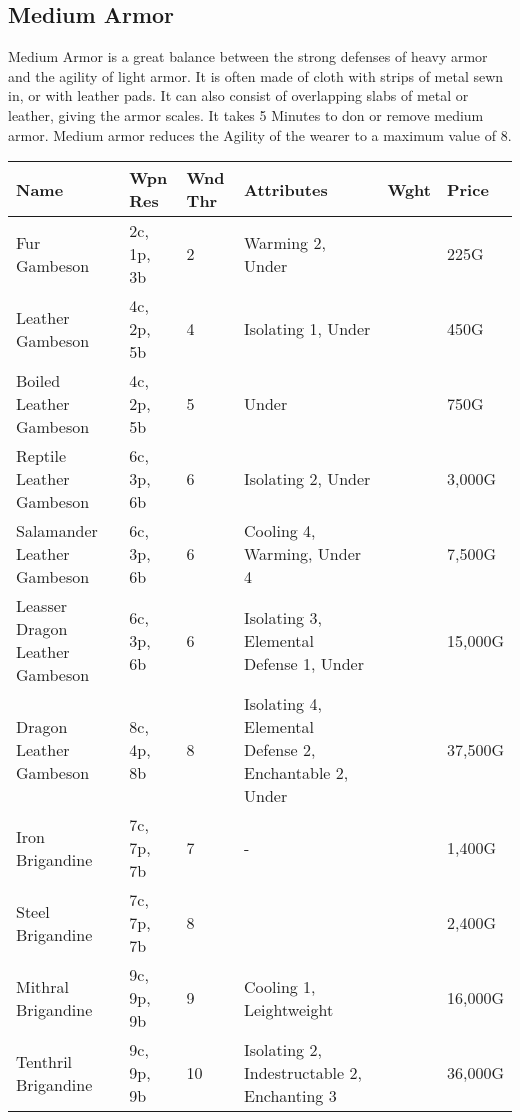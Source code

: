 \subsection{Medium Armor}

Medium Armor is a great balance between the strong defenses of heavy armor and the agility of light armor. It is often made of cloth with strips of metal sewn in, or with leather pads. It can also consist of overlapping slabs of metal or leather, giving the armor scales. It takes 5 Minutes to don or remove medium armor. Medium armor reduces the Agility of the wearer to a maximum value of 8.

\begin{longtable}{p{3.5cm} | p{1.5cm} | p{0.75cm} | p{4cm} | p{1cm} | p{1.25cm}}
	Name & Wpn Res & Wnd Thr &  Attributes & Wght & Price\\ \hline
	
	Fur Gambeson & 2c, 1p, 3b & 2 & Warming 2, Under &  & 225G\\
	
	Leather Gambeson & 4c, 2p, 5b & 4 & Isolating 1, Under &  & 450G\\
	
	Boiled Leather Gambeson & 4c, 2p, 5b & 5 & Under &  & 750G\\
	
	Reptile Leather Gambeson & 6c, 3p, 6b & 6 & Isolating 2, Under &  & 3,000G\\
	
	Salamander Leather Gambeson & 6c, 3p, 6b & 6 & Cooling 4, Warming, Under 4 &  & 7,500G\\
	
	Leasser Dragon Leather Gambeson & 6c, 3p, 6b & 6 & Isolating 3, Elemental Defense 1, Under &  & 15,000G\\
	
	Dragon Leather Gambeson & 8c, 4p, 8b & 8 & Isolating 4, Elemental Defense 2, Enchantable 2, Under &  & 37,500G\\
	
	Iron Brigandine & 7c, 7p, 7b & 7 & - &  & 1,400G\\
	
	Steel Brigandine & 7c, 7p, 7b & 8 &  &  & 2,400G\\
	
	Mithral Brigandine & 9c, 9p, 9b & 9 & Cooling 1, Leightweight &  & 16,000G\\
	
	Tenthril Brigandine & 9c, 9p, 9b & 10 & Isolating 2, Indestructable 2, Enchanting 3 &  & 36,000G\\
	

\end{longtable}
